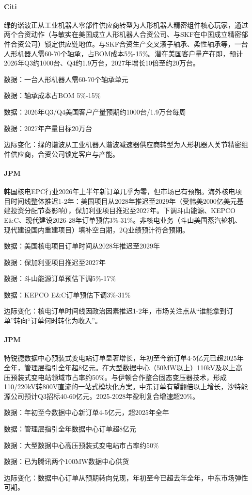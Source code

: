 \documentclass[11pt]{ctexart}
\begin{document}
\paragraph{Citi} 绿的谐波正从工业机器人零部件供应商转型为人形机器人精密组件核心玩家，通过两个合资动作（与敏实在美国成立人形机器人合资公司、与SKF在中国成立精密部件合资公司）锁定供应链地位。与SKF合资生产交叉滚子轴承、柔性轴承等，一台人形机器人需60-70个轴承，占BOM成本5\%-15\%。潜在美国客户量产在即，预计2026年Q3约1000台、Q4约1.9万台，2027年增长10倍至约20万台。
{\small\color{refgray}数据：一台人形机器人需60-70个轴承单元\par}
{\small\color{refgray}数据：轴承成本占BOM 5\%-15\%\par}
{\small\color{refgray}数据：2026年Q3/Q4美国客户产量预期约1000台/1.9万台每周\par}
{\small\color{refgray}数据：2027年产量目标20万台\par}
{\small\color{refgray}边际变化：绿的谐波从工业机器人谐波减速器供应商转型为人形机器人关节精密组件供应商，合资公司锁定客户与产能。\par}
\paragraph{JPM} 韩国核电EPC行业2026年上半年新订单几乎为零，但市场已有预期。海外核电项目时间线整体推迟1-2年：美国项目从2028年推迟至2029年（受韩美2000亿美元基建投资分配节奏影响），保加利亚项目推迟至2027年。下调斗山能源、KEPCO E\&C、现代建设2026-28年订单预估3\%-31\%。非核电业务（斗山美国蒸汽轮机、现代建设国内重建项目）填补空白期，2Q业绩预计符合预期。
{\small\color{refgray}数据：美国核电项目订单时间从2028年推迟至2029年\par}
{\small\color{refgray}数据：保加利亚项目推迟至2027年\par}
{\small\color{refgray}数据：斗山能源订单预估下调5\%-17\%\par}
{\small\color{refgray}数据：KEPCO E\&C订单预估下调3\%-31\%\par}
{\small\color{refgray}边际变化：核电订单时间线因政治因素推迟1-2年，市场关注点从“谁能拿到订单”转向“订单何时转化为收入”。\par}
\paragraph{JPM} 特锐德数据中心预装式变电站订单显著增长，年初至今新订单4-5亿元已超2025年全年，管理层指引全年超8亿元。在大型数据中心（50MW以上）110kV及以上高压预装式变电站领域市占率约50\%。与伊顿合作整合固态变压器技术，形成110/220kV转800V直流的一站式模块化方案。中东订单有望翻倍以上增长，沙特能源公司预计Q3招标40-60亿元。2025-2028年盈利复合增速超20\%。
{\small\color{refgray}数据：年初至今数据中心新订单4-5亿元，超2025年全年\par}
{\small\color{refgray}数据：管理层指引全年数据中心订单超8亿元\par}
{\small\color{refgray}数据：大型数据中心高压预装式变电站市占率约50\%\par}
{\small\color{refgray}数据：已为腾讯两个100MW数据中心供货\par}
{\small\color{refgray}边际变化：数据中心订单从预期转向兑现，年初至今已超去年全年，中东市场弹性可期。\par}
\end{document}
